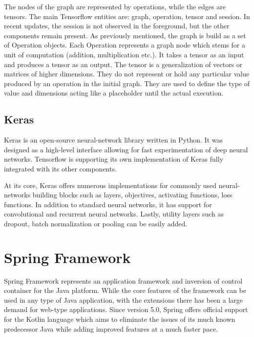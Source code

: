 The nodes of the graph are represented by operations, while the edges are tensors. The main Tensorflow entities are: graph, operation, tensor and session. In recent updates, the session is not observed in the foreground, but the other components remain present. As previously mentioned, the graph is build as a set of Operation objects. Each Operation represents a graph node which stems for a unit of computation (addition, multiplication etc.). It takes a tensor as an input and produces a tensor as an output. The tensor is a generalization of vectors or matrices of higher dimensions. They do not represent or hold any particular value produced by an operation in the initial graph. They are used to define the type of value and dimensions acting like a placeholder until the actual execution.

\subsection*{Keras}

Keras is an open-source neural-network library written in Python. It was designed as a high-level interface allowing for fast experimentation of deep neural networks. Tensorflow is supporting its own implementation of Keras fully integrated with its other components.

At its core, Keras offers numerous implementations for commonly used neural-networks building blocks such as layers, objectives, activating functions, loss functions. In addition to standard neural networks, it has support for convolutional and recurrent neural networks. Lastly, utility layers such as dropout, batch normalization or pooling can be easily added.

\section{Spring Framework}

Spring Framework represents an application framework and inversion of control container for the Java platform. While the core features of the framework can be used in any type of Java application, with the extensions there has been a large demand for web-type applications. Since version 5.0, Spring offers official support for the Kotlin language which aims to eliminate the issues of its much known predecessor Java while adding improved features at a much faster pace.

